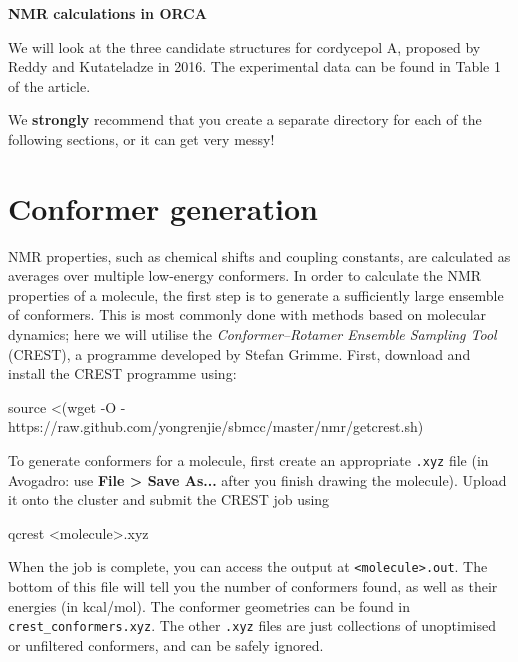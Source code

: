 \documentclass[10pt]{article}
\begin{document}
\textbf{\LARGE NMR calculations in ORCA}

\vspace{0.5cm}

We will look at the three candidate structures for cordycepol A, proposed by Reddy and Kutateladze in 2016.\autocite{Reddy2016} The experimental data can be found in Table 1 of the article.

\begin{warning}
We \textbf{strongly} recommend that you create a separate directory for each of the following sections, or it can get very messy!
\end{warning}

\section{Conformer generation}

NMR properties, such as chemical shifts and coupling constants, are calculated as averages over multiple low-energy conformers. In order to calculate the NMR properties of a molecule, the first step is to generate a sufficiently large ensemble of conformers. This is most commonly done with methods based on molecular dynamics; here we will utilise the \textit{Conformer--Rotamer Ensemble Sampling Tool} (CREST), a programme developed by Stefan Grimme.\autocite{Bannwarth2019, Grimme2019} First, download and install the CREST programme using:

\begin{cmdline}
source <(wget -O - https://raw.github.com/yongrenjie/sbmcc/master/nmr/getcrest.sh)
\end{cmdline}

To generate conformers for a molecule, first create an appropriate \texttt{.xyz} file (in Avogadro: use \textbf{File > Save As...} after you finish drawing the molecule). Upload it onto the cluster and submit the CREST job using

\begin{cmdline}
qcrest <molecule>.xyz
\end{cmdline}

When the job is complete, you can access the output at \texttt{<molecule>.out}. The bottom of this file will tell you the number of conformers found, as well as their energies (in kcal/mol). The conformer geometries can be found in \texttt{crest\_conformers.xyz}. The other \texttt{.xyz} files are just collections of unoptimised or unfiltered conformers, and can be safely ignored.
\end{document}
